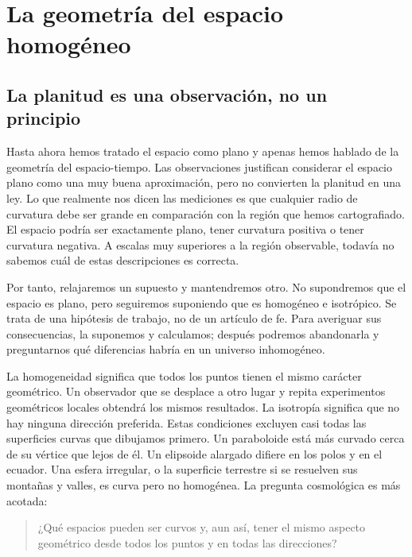 \chapter{La geometría del espacio homogéneo}


\section{La planitud es una observación, no un principio}

Hasta ahora hemos tratado el espacio como plano y apenas hemos hablado de la geometría del espacio-tiempo. Las observaciones justifican considerar el espacio plano como una muy buena aproximación, pero no convierten la planitud en una ley. Lo que realmente nos dicen las mediciones es que cualquier radio de curvatura debe ser grande en comparación con la región que hemos cartografiado. El espacio podría ser exactamente plano, tener curvatura positiva o tener curvatura negativa. A escalas muy superiores a la región observable, todavía no sabemos cuál de estas descripciones es correcta.

Por tanto, relajaremos un supuesto y mantendremos otro. No supondremos que el espacio es plano, pero seguiremos suponiendo que es homogéneo e isotrópico. Se trata de una hipótesis de trabajo, no de un artículo de fe. Para averiguar sus consecuencias, la suponemos y calculamos; después podremos abandonarla y preguntarnos qué diferencias habría en un universo inhomogéneo.

La homogeneidad significa que todos los puntos tienen el mismo carácter geométrico. Un observador que se desplace a otro lugar y repita experimentos geométricos locales obtendrá los mismos resultados. La isotropía significa que no hay ninguna dirección preferida. Estas condiciones excluyen casi todas las superficies curvas que dibujamos primero. Un paraboloide está más curvado cerca de su vértice que lejos de él. Un elipsoide alargado difiere en los polos y en el ecuador. Una esfera irregular, o la superficie terrestre si se resuelven sus montañas y valles, es curva pero no homogénea. La pregunta cosmológica es más acotada:
\begin{quote}
¿Qué espacios pueden ser curvos y, aun así, tener el mismo aspecto geométrico desde todos los puntos y en todas las direcciones?
\end{quote}

